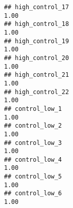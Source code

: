 \documentclass[
]{article}
\begin{document}
\begin{verbatim}
## high_control_17                                                                                                                                                                                                              1.00
## high_control_18                                                                                                                                                                                                              1.00
## high_control_19                                                                                                                                                                                                              1.00
## high_control_20                                                                                                                                                                                                              1.00
## high_control_21                                                                                                                                                                                                              1.00
## high_control_22                                                                                                                                                                                                              1.00
## control_low_1                                                                                                                                                                                                                1.00
## control_low_2                                                                                                                                                                                                                1.00
## control_low_3                                                                                                                                                                                                                1.00
## control_low_4                                                                                                                                                                                                                1.00
## control_low_5                                                                                                                                                                                                                1.00
## control_low_6                                                                                                                                                                                                                1.00

\end{verbatim}
\end{document}
